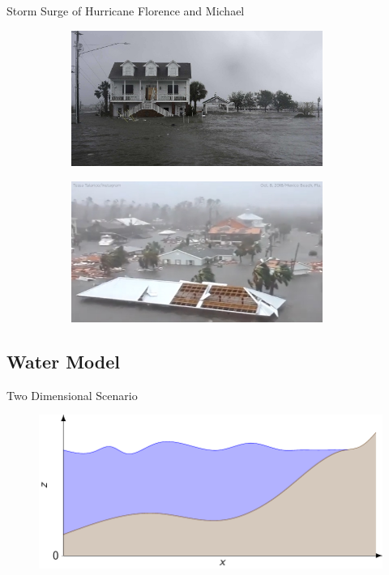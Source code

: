\documentclass[pdf]{beamer}
\begin{document}
\begin{frame}{Storm Surge of Hurricane Florence and Michael}
	\begin{figure}
		\centering
	\begin{subfigure}{0.5\textwidth}
		\includegraphics[width=0.9\textwidth]{./Pics/Web/HurricaneFlorence.jpg}
		\vspace{0.5cm}
	\end{subfigure}%
	\begin{subfigure}{0.5\textwidth}
		\includegraphics[width=0.9\textwidth]{./Pics/Web/HurricanMichael.jpg}
		\vspace{0.5cm}
	\end{subfigure}
\end{figure}
\end{frame}
\subsection{Water Model}
\begin{frame}{Two Dimensional Scenario}
		\begin{figure}
			\includegraphics[width=\textwidth]{./Pics/Tex/WaterModel/FressSurface.pdf}
		\end{figure}
\end{frame}
\end{document}
